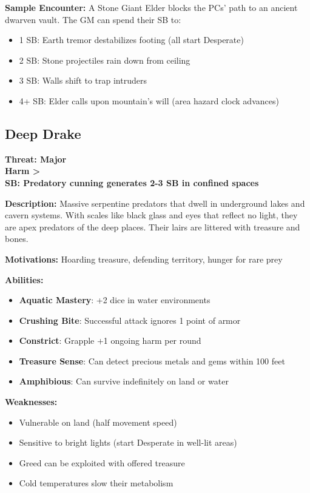 \documentclass[12pt]{article}
\newcommand{\cp}[1]{\textbf{SB: #1}}
\newcommand{\harm}[1]{\textbf{Harm #1}}
\newcommand{\threat}[1]{\textbf{Threat: #1}}
\begin{document}
\textbf{Sample Encounter:}
A Stone Giant Elder blocks the PCs' path to an ancient dwarven vault. The GM can spend their SB to:
\begin{itemize}
\item 1 SB: Earth tremor destabilizes footing (all start Desperate)
\item 2 SB: Stone projectiles rain down from ceiling
\item 3 SB: Walls shift to trap intruders
\item 4+ SB: Elder calls upon mountain's will (area hazard clock advances)
\end{itemize}

\subsection*{Deep Drake}

\threat{Major} \\
\harm{>} \\
\cp{Predatory cunning generates 2-3 SB in confined spaces}

\vspace{0.5em}
\textbf{Description:} Massive serpentine predators that dwell in underground lakes and cavern systems. With scales like black glass and eyes that reflect no light, they are apex predators of the deep places. Their lairs are littered with treasure and bones.

\textbf{Motivations:} Hoarding treasure, defending territory, hunger for rare prey

\textbf{Abilities:}
\begin{itemize}
\item \textbf{Aquatic Mastery}: +2 dice in water environments
\item \textbf{Crushing Bite}: Successful attack ignores 1 point of armor
\item \textbf{Constrict}: Grapple +1 ongoing harm per round
\item \textbf{Treasure Sense}: Can detect precious metals and gems within 100 feet
\item \textbf{Amphibious}: Can survive indefinitely on land or water
\end{itemize}

\textbf{Weaknesses:}
\begin{itemize}
\item Vulnerable on land (half movement speed)
\item Sensitive to bright lights (start Desperate in well-lit areas)
\item Greed can be exploited with offered treasure
\item Cold temperatures slow their metabolism
\end{itemize}
\end{document}
